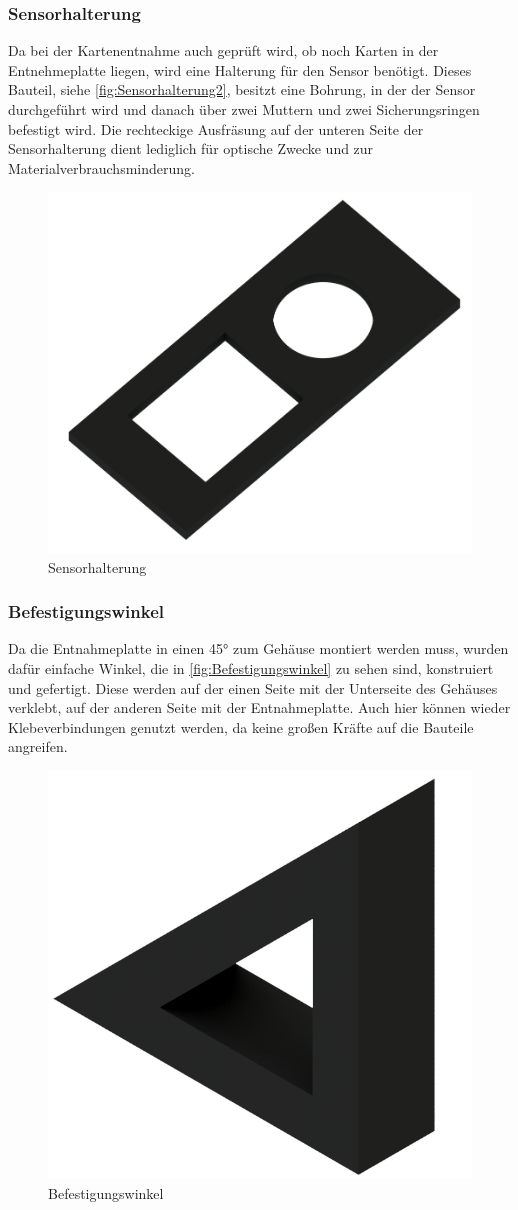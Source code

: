 \subsubsection{Sensorhalterung}

Da bei der Kartenentnahme auch geprüft wird, ob noch Karten in der Entnehmeplatte liegen, wird eine Halterung für den
Sensor benötigt. Dieses Bauteil, siehe \autoref{fig:Sensorhalterung2}, besitzt eine Bohrung, in der der Sensor durchgeführt wird und danach über zwei Muttern und
zwei Sicherungsringen befestigt wird. Die rechteckige Ausfräsung auf der unteren Seite der Sensorhalterung dient lediglich
für optische Zwecke und zur Materialverbrauchsminderung.

\begin{figure}[H]
    \centering
    \includegraphics[width=8 cm]{fig/mech/SensorStuetze.png}
    \caption{Sensorhalterung}
    \label{fig:Sensorhalterung2}
\end{figure}

\subsubsection{Befestigungswinkel}


Da die Entnahmeplatte  in einen 45° zum Gehäuse montiert werden muss, wurden dafür einfache Winkel, die in \autoref{fig:Befestigungswinkel} zu sehen sind, konstruiert und gefertigt.
Diese werden auf der einen Seite mit der Unterseite des Gehäuses verklebt, auf der anderen Seite mit der Entnahmeplatte.
Auch hier können wieder Klebeverbindungen genutzt werden, da keine großen Kräfte auf die Bauteile angreifen.

\begin{figure} [H]
    \centering
    \includegraphics[width=4 cm]{fig/mech/Winkel}
    \caption{Befestigungswinkel}
    \label{fig:Befestigungswinkel}
\end{figure}

